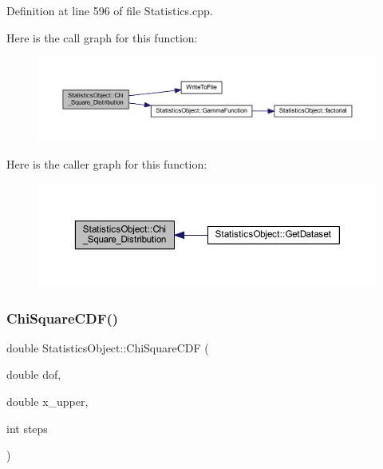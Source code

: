 Definition at line 596 of file Statistics.\+cpp.

Here is the call graph for this function\+:
\nopagebreak
\begin{figure}[H]
\begin{center}
\leavevmode
\includegraphics[width=350pt]{class_statistics_object_a2bdaa3f298838c3f83bf17189c832623_cgraph}
\end{center}
\end{figure}
Here is the caller graph for this function\+:
\nopagebreak
\begin{figure}[H]
\begin{center}
\leavevmode
\includegraphics[width=350pt]{class_statistics_object_a2bdaa3f298838c3f83bf17189c832623_icgraph}
\end{center}
\end{figure}
\mbox{\label{class_statistics_object_a7ad5fc88ce637ed421f4fccf92a8b5e0}} 
\subsubsection{\texorpdfstring{Chi\+Square\+C\+D\+F()}{ChiSquareCDF()}}
{\footnotesize\ttfamily double Statistics\+Object\+::\+Chi\+Square\+C\+DF (\begin{DoxyParamCaption}\item[{double}]{dof,  }\item[{double}]{x\+\_\+upper,  }\item[{int}]{steps }\end{DoxyParamCaption})}



